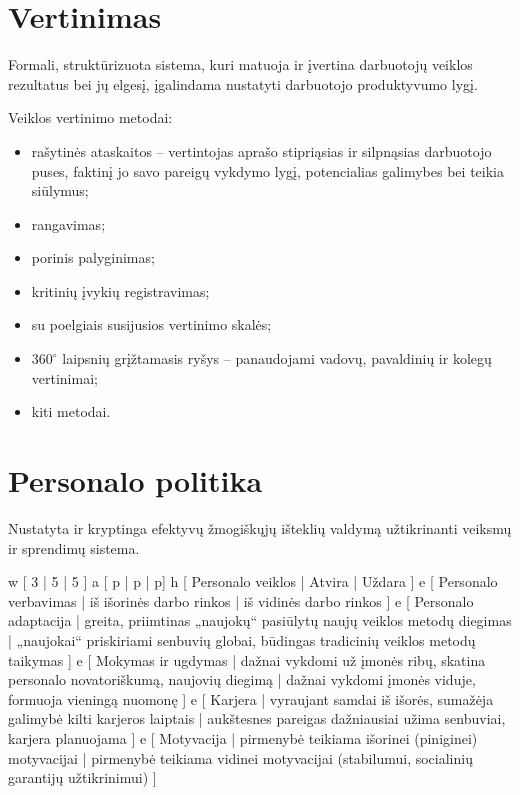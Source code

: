\section{Vertinimas}

\begin{defn}
  Formali, struktūrizuota sistema, kuri matuoja ir įvertina darbuotojų
  veiklos rezultatus bei jų elgesį, įgalindama nustatyti darbuotojo
  produktyvumo lygį.
\end{defn}

Veiklos vertinimo metodai:
\begin{itemize}
  \item rašytinės ataskaitos – vertintojas aprašo stipriąsias ir
    silpnąsias darbuotojo puses, faktinį jo savo pareigų vykdymo
    lygį, potencialias galimybes bei teikia siūlymus;
  \item rangavimas;
  \item porinis palyginimas;
  \item kritinių įvykių registravimas;
  \item su poelgiais susijusios vertinimo skalės;
  \item $360^{\circ}$ laipsnių grįžtamasis ryšys – panaudojami vadovų,
    pavaldinių ir kolegų vertinimai;
  \item kiti metodai.
\end{itemize}

\section{Personalo politika}

\begin{defn}
  Nustatyta ir kryptinga efektyvų žmogiškųjų išteklių valdymą užtikrinanti
  veiksmų ir sprendimų sistema.
\end{defn}

\xtable
{
  w [ 3 | 5 | 5 ]
  a [ p | p | p]
  h [ Personalo veiklos | Atvira | Uždara ]
  e [ Personalo verbavimas
    | iš išorinės darbo rinkos
    | iš vidinės darbo rinkos
  ]
  e [ Personalo adaptacija
    | greita, priimtinas „naujokų“ pasiūlytų naujų veiklos metodų diegimas
    | „naujokai“ priskiriami senbuvių globai, būdingas tradicinių veiklos
      metodų taikymas
  ]
  e [ Mokymas ir ugdymas
    | dažnai vykdomi už įmonės ribų, skatina personalo novatoriškumą,
      naujovių diegimą
    | dažnai vykdomi įmonės viduje, formuoja vieningą nuomonę
  ]
  e [ Karjera
    | vyraujant samdai iš išorės, sumažėja galimybė kilti karjeros laiptais
    | aukštesnes pareigas dažniausiai užima senbuviai, karjera planuojama
  ]
  e [ Motyvacija
    | pirmenybė teikiama išorinei (piniginei) motyvacijai
    | pirmenybė teikiama vidinei motyvacijai (stabilumui, socialinių
      garantijų užtikrinimui)
  ]
}

